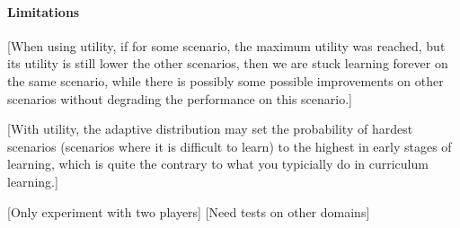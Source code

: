 \paragraph{Limitations}
[When using utility, if for some scenario, the maximum utility was reached, but its utility is still lower the other scenarios, then we are stuck learning forever on the same scenario, while there is possibly some possible improvements on other scenarios without degrading the performance on this scenario.]

[With utility, the adaptive distribution may set the probability of hardest scenarios (scenarios where it is difficult to learn) to the highest in early stages of learning, which is quite the contrary to what you typicially do in curriculum learning.]

[Only experiment with two players]
[Need tests on other domains]

